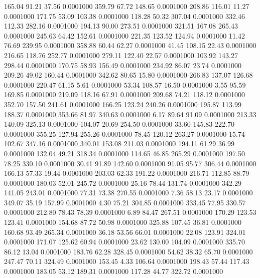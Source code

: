  165.04   91.21   37.56   0.0001000
 359.79   67.72  148.65   0.0001000
 208.86  116.01   11.27   0.0001000
 171.75   53.09  103.38   0.0001000
 118.28   50.32  307.04   0.0001000
 332.46  112.33  282.16   0.0001000
 194.13   90.00  273.51   0.0001000
 321.51  167.08  265.43   0.0001000
 245.63   64.42  152.61   0.0001000
 221.35  123.52  124.94   0.0001000
  11.42   76.69  239.95   0.0001000
 358.88   60.44   62.27   0.0001000
  41.45  108.15   22.43   0.0001000
 216.65  118.76  252.77   0.0001000
 279.11  122.40   22.57   0.0001000
 103.92  143.27  298.44   0.0001000
 170.75   58.93  156.49   0.0001000
 234.92   86.07   23.74   0.0001000
 209.26   49.02  160.44   0.0001000
 342.62   80.65   15.80   0.0001000
 266.83  137.07  126.68   0.0001000
 220.47   61.15    5.61   0.0001000
  53.34  108.57   16.50   0.0001000
   3.55   95.59  169.85   0.0001000
 219.09  118.16   67.91   0.0001000
 209.68   74.21  118.12   0.0001000
 352.70  157.50  241.61   0.0001000
 166.25  123.24  240.26   0.0001000
 195.87  113.99  188.37   0.0001000
 353.66   81.97  340.63   0.0001000
   6.17   89.64   91.09   0.0001000
 213.33  140.09  325.13   0.0001000
 104.07   20.69  254.50   0.0001000
  33.60  145.83  222.70   0.0001000
 355.25  127.94  255.26   0.0001000
  78.45  120.12  263.27   0.0001000
  15.74  102.67  347.16   0.0001000
 340.01  153.08  211.03   0.0001000
 194.11   61.29   36.99   0.0001000
 132.04   49.21  318.34   0.0001000
 114.65   46.85  265.29   0.0001000
 197.50   78.25  330.10   0.0001000
  30.41   91.89  142.60   0.0001000
  91.05   95.77  306.44   0.0001000
 166.13   57.33   19.44   0.0001000
 203.03   62.33  191.22   0.0001000
 216.71  112.85   88.79   0.0001000
 180.03   52.01  245.72   0.0001000
  25.16   78.44  131.74   0.0001000
 342.29  141.05  243.01   0.0001000
  77.31   73.38  270.55   0.0001000
   7.36   58.13   23.17   0.0001000
 349.07   35.19  157.99   0.0001000
   4.30   75.21  304.85   0.0001000
 333.45   77.95  330.57   0.0001000
 212.80   78.43   78.39   0.0001000
   6.89   84.47  267.51   0.0001000
 170.29  123.53  123.41   0.0001000
 154.68   87.72   50.98   0.0001000
 325.88  107.45   36.81   0.0001000
 160.68   93.49  265.34   0.0001000
  36.18   53.56   66.01   0.0001000
  22.08  123.91  324.01   0.0001000
 171.07  125.62   60.94   0.0001000
  23.62  130.00  104.09   0.0001000
 335.70   86.12   13.04   0.0001000
 183.76   62.28  328.45   0.0001000
  54.62   38.32   65.70   0.0001000
 247.47   70.11  324.49   0.0001000
 153.45    4.33  106.64   0.0001000
 198.43   57.44  117.43   0.0001000
 183.05   53.12  189.31   0.0001000
 117.28   44.77  322.72   0.0001000
